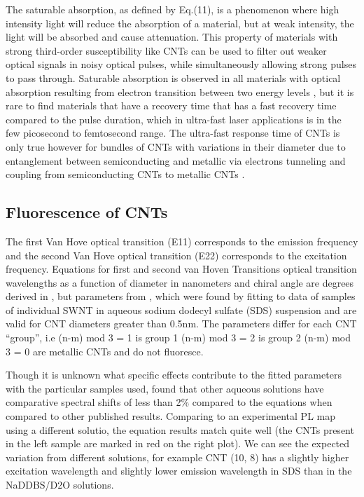 The saturable absorption, as defined by Eq.(11), is a phenomenon where high intensity light will reduce the absorption of a material, but at weak intensity, the light will be absorbed and cause attenuation. This property of materials with strong third-order susceptibility like CNTs can be used to filter out weaker optical signals in noisy optical pulses, while simultaneously allowing strong pulses to pass through. Saturable absorption is observed in all materials with optical absorption resulting from electron transition between two energy levels \cite{thomsen}, but it is rare to find materials that have a recovery time that has a fast recovery time compared to the pulse duration, which in ultra-fast laser applications is in the few picosecond to femtosecond range. The ultra-fast response time of CNTs  is only true however for bundles of CNTs with variations in their diameter due to entanglement between semiconducting and metallic via electrons tunneling and coupling from semiconducting CNTs to metallic CNTs \cite{gambetta}. 

\subsection{Fluorescence of CNTs}
The first Van Hove optical transition (E11)
corresponds to the emission frequency and the
second Van Hove optical transition (E22) corresponds
to the excitation frequency. Equations for first and second van Hoven Transitions optical transition wavelengths as a function of diameter in
nanometers and chiral angle are degrees derived in \cite{bachilo}, but  parameters from \cite{weisman}, which were found by fitting
to data of samples of individual SWNT in aqueous sodium dodecyl sulfate (SDS) suspension and are valid for
CNT diameters greater than 0.5nm.
 The parameters differ for each CNT “group”, i.e  (n-m) mod 3 = 1 is group 1
 (n-m) mod 3 = 2 is group 2
 (n-m) mod 3 = 0 are metallic CNTs and do not fluoresce.

Though it is unknown what specific effects contribute to the fitted parameters with the particular samples used, \cite{weisman}found that other
aqueous solutions have comparative spectral shifts of less than 2\% compared to the equations when compared to other published
results. Comparing to an experimental PL map using a different solutio\cite{giordani}, the equation results match quite well (the CNTs present in
the left sample are marked in red on the right plot). We can see the expected variation from different solutions, for example CNT (10,
8) has a slightly higher excitation wavelength and slightly lower emission wavelength in SDS than in the NaDDBS/D2O solutions.

